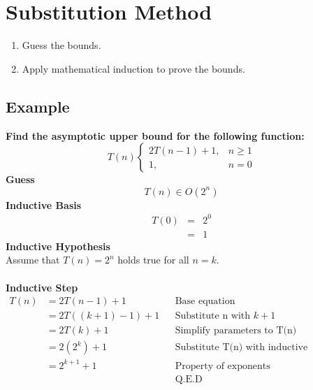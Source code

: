 \section{Substitution Method}
\begin{enumerate}
	\item Guess the bounds.
	\item Apply mathematical induction to prove the bounds. 
\end{enumerate}

\subsection{Example}
\textbf{Find the asymptotic upper bound for the following function:}
$$
T(n) \begin{cases}
	2T(n-1) + 1, & n \geq 1\\
	1, & n = 0
	\end{cases}
$$
\textbf{Guess}
$$T(n) \in O(2^n)$$
\textbf{Inductive Basis}
\begin{eqnarray*}
	T(0) &=& 2^0\\
	&=& 1
\end{eqnarray*}
\textbf{Inductive Hypothesis}\\
Assume that $T(n) = 2^n$ holds true for all $n = k$.\\\\
\textbf{Inductive Step}
\begin{align*}
T(n)	&=	2T(n-1) + 1						&& \text{Base equation}\\
		&= 	2T((k+1) - 1) + 1				&& \text{Substitute n with } k+1\\
		&=	2T(k) + 1						&& \text{Simplify parameters to T(n)}\\
		&=  2(2^k) + 1						&& \text{Substitute T(n) with inductive hypothesis}\\
		&=  2^{k+1} + 1						&& \text{Property of exponents}\\
&											&& \text{Q.E.D}
\end{align*}